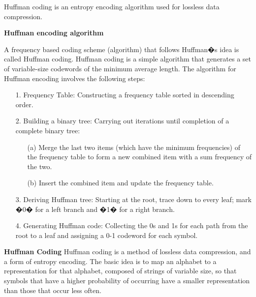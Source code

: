 

{
Huffman coding is an entropy encoding algorithm used for lossless data compression.


}

{
\noindent \textbf{Huffman encoding algorithm}

A frequency based coding scheme (algorithm) that follows Huffman�s idea is called Huffman coding. Huffman coding is a simple algorithm that generates a set of variable-size codewords of the minimum average length. The algorithm for Huffman encoding involves the following steps:
}

{
\begin{itemize}
\item[1.] Frequency Table: Constructing a frequency table sorted in descending order.

\item[2.] Building a binary tree:
    Carrying out iterations until completion of a complete binary tree:
    \begin{itemize}
    \item[(a)] Merge the last two items (which have the minimum frequencies) of    the frequency table to form a new combined item with a sum
    frequency of the two.
    \item[(b)] Insert the combined item and update the frequency table.
    \end{itemize}

\item[3.] Deriving Huffman tree:
Starting at the root, trace down to every leaf; mark �0� for a left branch and �1� for a right branch.

\item[4.] Generating Huffman code:
Collecting the 0s and 1s for each path from the root to a leaf and assigning a 0-1 codeword for each symbol.

\end{itemize}
}

{
\noindent \textbf{Huffman Coding}
Huffman coding is a method of lossless data compression, and a form of entropy encoding. The basic idea is to map an alphabet to a representation for that alphabet, composed of strings of variable size, so that symbols that have a higher probability of occurring have a smaller representation than those that occur less often.

}


